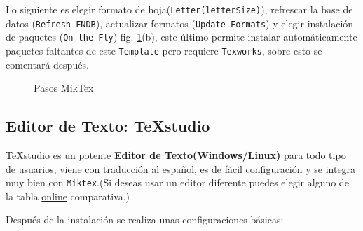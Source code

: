 Lo siguiente es elegir formato de hoja(\verb|Letter(letterSize)|), refrescar la base de datos (\verb|Refresh FNDB|), actualizar formatos (\verb|Update Formats|) y elegir instalación de paquetes (\verb|On the Fly|) fig. \ref{fig:Miktex}(b), este último permite instalar automáticamente paquetes faltantes de este \verb|Template| pero requiere \verb|Texworks|, sobre esto se comentará después. 

\begin{figure}[H]
	\centering
	\caption{Pasos MikTex}
	\label{fig:Miktex}
\end{figure}

\subsection{Editor de Texto: TeXstudio}
\href{http://texstudio.sourceforge.net/}{TeXstudio} es un potente \textbf{Editor de Texto(Windows/Linux)} para todo tipo de usuarios, viene con traducción al español, es de fácil configuración y se integra muy bien con \verb|Miktex|.(Si deseas usar un editor diferente puedes elegir alguno de la tabla \href{http://en.wikipedia.org/wiki/Comparison_of_TeX_editors}{online} comparativa.)  

Después de la instalación se realiza unas configuraciones básicas:

